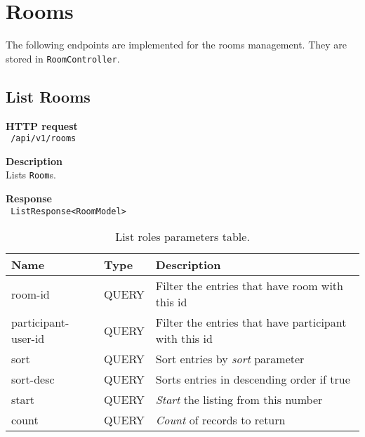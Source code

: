 \section{Rooms}
The following endpoints are implemented for the rooms management. They are stored in \texttt{RoomController}.

\subsection{List Rooms}
\begin{description}
    \item \textbf{HTTP request}\\
        \texttt{\text{[GET]} /api/v1/rooms}
    \item \textbf{Description}\\
        Lists \texttt{Room}s.
    \item \textbf{Response}\\
        \texttt{\text{[200 OK]} ListResponse<RoomModel>}
\end{description}
\begin{table}[ht!]
    \begin{tabularx}{\textwidth}{llX}
        \toprule
        Name & Type & Description \\
        \midrule
        room-id & QUERY & Filter the entries that have room with this id \\ 
        participant-user-id & QUERY & Filter the entries that have participant with this id \\
        sort & QUERY & Sort entries by \emph{sort} parameter \\
        sort-desc & QUERY & Sorts entries in descending order if true \\
        start & QUERY & \emph{Start} the listing from this number \\  
        count & QUERY & \emph{Count} of records to return \\
        \bottomrule
        \end{tabularx}
    \caption{List roles parameters table.}
\end{table}

